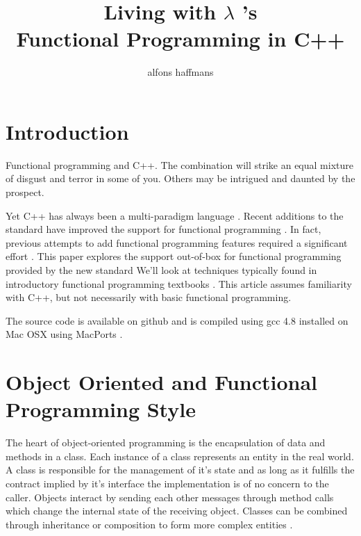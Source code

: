\documentclass[12pt,fleqn]{article}
\begin{document}
\title{Living  with $\lambda$ 's \\ Functional Programming in C++}
\author {alfons haffmans}
\maketitle

\section* {Introduction}
Functional programming and C++.
The combination will strike an equal mixture of disgust and terror in some of you.
Others may be intrigued and daunted by the prospect.

Yet C++ has always been a multi-paradigm language \cite{stroustrup}.
Recent additions to the standard have improved the support for functional programming \cite{josuttis}.
In fact, previous attempts to add functional programming features required a significant effort \cite{mcnamara}.
This paper explores the support out-of-box for functional programming provided by the new standard
We'll look at techniques typically found in introductory functional programming textbooks \cite{lipovaca, hutton, bird}.
This article assumes familiarity with C++, but not necessarily with basic functional programming.

The source code is available on github \cite{sourcecode} and is compiled using gcc 4.8 installed on Mac OSX using MacPorts \cite{macports}.


\section*{Object Oriented and Functional Programming Style}
The heart of object-oriented programming is the encapsulation of data and methods in a class.
Each instance of a class represents an entity in the real world. 
A class is responsible for the management of it's state and as long as it fulfills the contract implied by it's interface the implementation is of no concern to the caller.
Objects interact by sending each other messages through method calls which change the internal state of the receiving object.
Classes can be combined through inheritance or composition to form more complex entities \cite{designpatterns}. 
\end{document}

